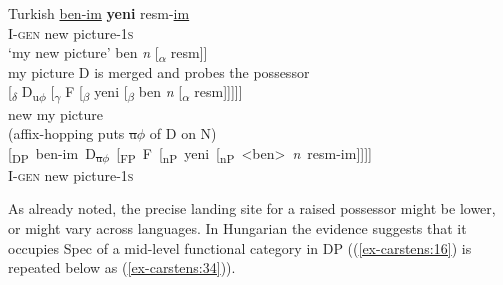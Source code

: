 \documentclass[output=paper
,modfonts
,nonflat]{langsci/langscibook}
\begin{document}
\begin{exe} \settowidth{}
	\ex Turkish \label{ex-carstens:33}
	\xlist
	\ex 
	\gll\underline{ben}\underline{-im}   \textbf{yeni}  resm-\underline{im} \\
	I-\textsc{gen}  new   picture-1\textsc{s}\\
	\glt `my new picture'  	
	\ex {[\textsubscript{$\beta$}} ben \textit{n} [\textsubscript{$\alpha$} resm]]\\
	\hspace{0.5cm}my	\hspace{0.8cm}picture
	\ex D is merged and probes the possessor\\
	{[\textsubscript{$\delta$}} D\textsubscript{u}\textsubscript{$\phi$} [\textsubscript{$\gamma$} F [\textsubscript{$\beta$} yeni {[\textsubscript{${\beta}$}} ben \textit{n} [\textsubscript{$\alpha$} resm]]]]]\\
	\hspace{2.3cm}new  \hspace{.4cm}my \hspace{.8cm}picture\\
	\ex\label{ex-carstens:33d} (affix-hopping puts \sout{u$\phi$} of D on N)\\
	\mbox{[\textsubscript{DP} ben-im D\textsubscript{\sout{u$\phi$}} [\textsubscript{FP} F [\textsubscript{nP} yeni [\textsubscript{nP} <ben> \textit{n} resm-im]]]]}\\ 
	\hspace{.59cm}I-\textsc{gen} \hspace{2.38cm}new  \hspace{1.95cm}picture-1\textsc{s}\\
	\endxlist
\end{exe}
As already noted, the precise landing site for a raised possessor might be lower, or might vary across languages. In Hungarian the evidence suggests that it occupies Spec of a mid-level functional category in DP ((\ref{ex-carstens:16}) is repeated below as (\ref{ex-carstens:34})). 
\end{document}
